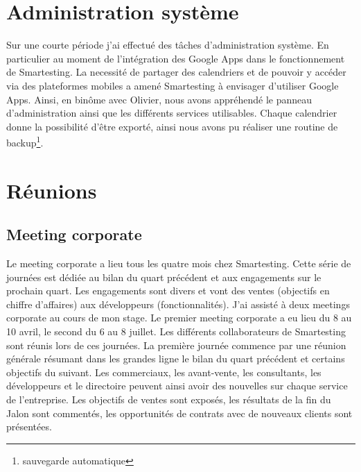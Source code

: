\section{Administration système}
Sur une courte période j'ai effectué des t\^aches d'administration système. En particulier au moment de l'intégration des Google Apps dans le fonctionnement de Smartesting. La necessité de partager des calendriers et de pouvoir y accéder via des plateformes mobiles a amené Smartesting à envisager d'utiliser Google Apps. Ainsi, en binôme avec Olivier, nous avons appréhendé le panneau d'administration ainsi que les différents services utilisables. Chaque calendrier donne la possibilité d'être exporté, ainsi nous avons pu réaliser une routine de backup\footnote{sauvegarde automatique}.
\section{Réunions}
\subsection{Meeting corporate}
Le meeting corporate a lieu tous les quatre mois chez Smartesting. Cette série de journées est dédiée au bilan du quart précédent et aux engagements sur le prochain quart. Les engagements sont divers et vont des ventes (objectifs en chiffre d'affaires) aux développeurs (fonctionnalités). J'ai assisté à deux meetings corporate au cours de mon stage. Le premier meeting corporate a eu lieu du 8 au 10 avril, le second du 6 au 8 juillet. Les différents collaborateurs de Smartesting sont réunis lors de ces journées. La première journée commence par une réunion générale résumant dans les grandes ligne le bilan du quart précédent et certains objectifs du suivant. Les commerciaux, les avant-vente, les consultants, les développeurs et le directoire peuvent ainsi avoir des nouvelles sur chaque service de l'entreprise. Les objectifs de ventes sont exposés, les résultats de la fin du Jalon sont commentés, les opportunités de contrats avec de nouveaux clients sont présentées.
